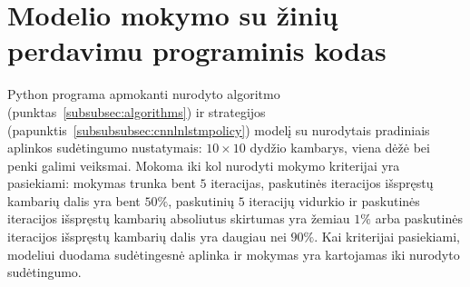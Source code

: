 \documentclass{VUMIFPSbakalaurinis}
\begin{document}
\section{Modelio mokymo su žinių perdavimu programinis kodas}\label{app:curriculum}
{
	Python programa apmokanti nurodyto algoritmo (punktas~\ref{subsubsec:algorithms}) ir  strategijos (papunktis~\ref{subsubsubsec:cnnlnlstmpolicy}) modelį su nurodytais pradiniais aplinkos sudėtingumo nustatymais:  \(10 \times 10\) dydžio kambarys, viena dėžė bei penki galimi veiksmai. Mokoma iki kol nurodyti mokymo kriterijai yra pasiekiami: mokymas trunka bent \(5\) iteracijas, paskutinės iteracijos išspręstų kambarių dalis yra bent \(50\%\), paskutinių \(5\) iteracijų vidurkio ir paskutinės iteracijos išspręstų kambarių absoliutus skirtumas yra žemiau \(1\%\) arba paskutinės iteracijos išspręstų kambarių dalis yra daugiau nei \(90\%\). Kai kriterijai pasiekiami, modeliui duodama sudėtingesnė aplinka ir mokymas yra kartojamas iki nurodyto sudėtingumo.
	
}
\end{document}
